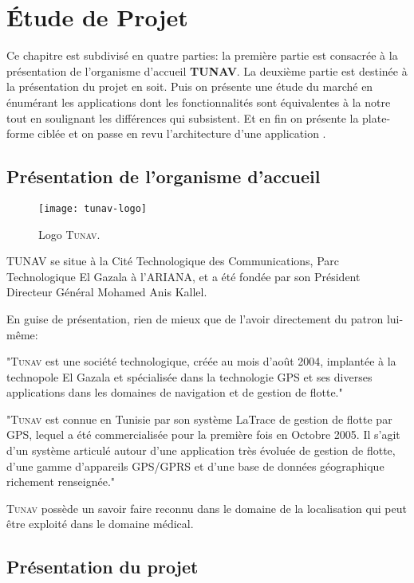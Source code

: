
\chapter{Étude de Projet}

Ce chapitre est subdivisé en quatre parties: la première partie est
consacrée à la présentation de l’organisme d’accueil \textbf{TUNAV}. La
deuxième partie est destinée à la présentation du projet en soit. Puis on présente une étude du marché en énumérant les
applications dont les fonctionnalités sont équivalentes à la notre tout
en soulignant les différences qui subsistent. Et en fin on présente la
plate-forme ciblée et on passe en revu l’architecture d’une application
\android{}.

\section{Présentation de l'organisme d'accueil}  

\begin{figure}
\center
\texttt{[image: tunav-logo]}
\caption{Logo \textsc{Tunav}.}
\end{figure}

TUNAV se situe à la Cité Technologique des Communications, Parc
Technologique El Gazala à l’ARIANA, et a été fondée par son Président
Directeur Général Mohamed Anis Kallel.

En guise de présentation, rien de mieux que de l’avoir directement du patron lui-même\cite{index_tunisie}:

"\textsc{Tunav} est une société technologique, créée au mois d’août
2004, implantée à la technopole El Gazala et spécialisée dans la
technologie GPS et ses diverses applications dans les domaines de
navigation et de gestion de flotte."

"\textsc{Tunav} est connue en Tunisie par son système \og{}LaTrace\fg{}
de gestion de flotte par GPS, lequel a été commercialisée pour la
première fois en Octobre 2005. Il s'agit d'un système articulé autour
d'une application très évoluée de gestion de flotte, d'une gamme
d'appareils GPS/GPRS et d'une base de données géographique richement
renseignée."

\textsc{Tunav} possède un savoir faire reconnu dans le domaine de la
localisation qui peut être exploité dans le domaine médical.

\section{Présentation du projet}

